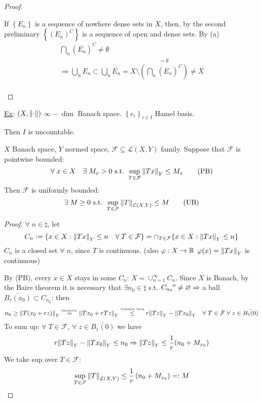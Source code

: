 \begin{proof}
\begin{itemize}
        If \(\left\{ E_n \right\}\) is a sequence of nowhere dense sets in \(X\), then, by the second preliminary \(\left\{ (E_n)^C \right\}\) is a sequence of open and dense sets. By (a) 
        \[
            \begin{array}{l}
                \bigcap_n (\overline{E_n})^C \neq \emptyset \\
                \Rightarrow \bigcup_n E_n \subset \bigcup_n \overline{E_n} = X \setminus \overset{= \emptyset}{\left(\bigcap_n (\overline{E_n})^C\right)} \neq X \\

            \end{array} 
        \]
    \end{itemize}
\end{proof}
\underline{Ex}: \((X, \norm{\cdot})\) \(\infty-\dim\) Banach space. \(\left\{ e_i \right\}_{i \in I}\) Hamel basis. 

Then \(I\) is uncountable.
\begin{theorem}
    \(X\) Banach space, \(Y\) normed space, \(\mathcal{F} \subseteq \mathcal{L}(X, Y)\) family.
    Suppose that \(\mathcal{F}\) is pointwise bounded: 
    \[
        \forall\; x \in X \quad \exists \; M_x >0 \text{ s.t. } \sup_{T \in \mathcal{F}} \norm{Tx}_Y \leq M_x \tag*{(PB)}
    \]
    Then \(\mathcal{F} \) is uniformly bounded: 
    \[
        \exists \; M \geq 0 \text{ s.t. } \sup_{T \in \mathcal{F}} \norm{T}_{\mathcal{L}(X, Y)} \leq M \tag*{(UB)}
    \]
\end{theorem}
\begin{proof}
    \(\forall \; n \in \natural\), let 
    \[
        C_n := \{ x \in X: \norm{Tx}_Y \leq n \quad \forall \; T \in \mathcal{F} \} 
        = \cap_{T \in \mathcal{F}} \{ x \in X: \norm{Tx}_Y \leq n \}
    \]
    \(C_n\) is a closed set \(\forall \; n\), since \(T\) is continuous. (also \(\varphi: X \to \mathbb{R} \) \(\varphi(x)=\norm{Tx}_Y\) is continuous)

    By (PB), every \(x \in X\) stays in some \(C_n\): \(X = \cup_{n=1}^\infty C_n\). 
    Since \(X\) is Banach, by the Baire theorem it is necessary that \(\exists n_0 \in \natural\) s.t. \({\kern0ptC_{n_0}}^{\mathrm{o}} \neq \varnothing \Rightarrow\) a ball \(\bar{B_r(x_0)} \subset C_{n_0}\): then
    \[
        n_0 \geq \norm{T(x_0 + rz)}_Y \overset{\text{\tiny{linearity}}}{=} \norm{Tx_0 + rTz}_Y \overset{\text{\tiny{triangle ineq}}}{\leq} r\norm{Tz}_Y - \norm{Tx_0}_Y \quad \forall \; T \in \mathcal{F} \; \forall \; z \in \bar{B_1(0)}
    \]
    To sum up: \(\forall \; T \in \mathcal{F} \), \(\forall \; z \in \bar{B_1(0)}\) we have 
    \[
        r \norm{Tz}_Y - \norm{Tx_0}_Y \leq n_0 \Rightarrow \norm{Tz}_Y \leq \frac{1}{r}(n_0 + M_{x_0})
    \]
    We take sup over \(T \in \mathcal{F}\):
    \[
        \sup_{T \in \mathcal{F}} \norm{T}_{\mathcal{L}(X, Y)} \leq \frac{1}{r} \left(n_0 + M_{x_0}\right) =: M
    \]
\end{proof}

